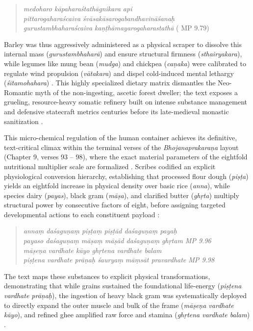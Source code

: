 \documentclass[11pt,twoside,letterpaper]{article}
\begin{document}
\begin{quote}
\textit{medoharo kāpaharaśtathāgnikara api \\
pittarogaharaścaiva śvāsakāsarogabandhavināśanaḥ  \\
gurustambhaharaścaiva kaṇṭhāmayarogaharastathā }( MP 9.79)
\end{quote}

Barley was thus aggressively administered as a physical scraper to dissolve this internal mass (\textit{gurustambhaharā}) and ensure structural firmness (\textit{sthairyakara}), while legumes like mung bean (\textit{mudga}) and chickpea (\textit{caṇaka}) were calibrated to regulate wind propulsion (\textit{vātakara}) and dispel cold-induced mental lethargy (\textit{śītamohahara}) \citep{MP_7}. This highly specialized dietary matrix dismantles the Neo-Romantic myth of the non-ingesting, ascetic forest dweller; the text exposes a grueling, resource-heavy somatic refinery built on intense substance management and defensive statecraft metrics centuries before its late-medieval monastic sanitization \citep{MP_7, Wujastyk2025}.

This micro-chemical regulation of the human container achieves its definitive, text-critical climax within the terminal verses of the \textit{Bhojanaprakaraṇa} layout (Chapter 9, verses 93 -- 98), where the exact material parameters of the eightfold nutritional multiplier scale are formalized \citep{MP_7}. Scribes codified an explicit physiological conversion hierarchy, establishing that processed flour dough (\textit{piṣṭa}) yields an eightfold increase in physical density over basic rice (\textit{anna}), while species dairy (\textit{payas}), black gram (\textit{māṣa}), and clarified butter (\textit{ghṛta}) multiply structural power by consecutive factors of eight, before assigning targeted developmental actions to each constituent payload \citep{MP_7}:

\begin{quote}
\small
\textit{annaṃ daśaguṇaṃ piṣṭaṃ piṣṭād daśaguṇaṃ payaḥ \vert \\
payaso daśaguṇaṃ māṣaṃ māṣād daśaguṇaṃ ghṛtam \vert\vert MP 9.96 \vert\vert \\
māṣeṇa vardhate kāyo ghṛtena vardhate balam \vert \\
piṣṭena vardhate prāṇaḥ śauryaṃ māṃsāt pravardhate \vert\vert MP 9.98 \vert\vert}
\end{quote}

The text maps these substances to explicit physical transformations, demonstrating that while grains sustained the foundational life-energy (\textit{piṣṭena vardhate prāṇaḥ}), the ingestion of heavy black gram was systematically deployed to directly expand the outer muscle and bulk of the frame (\textit{māṣeṇa vardhate kāyo}), and refined ghee amplified raw force and stamina (\textit{ghṛtena vardhate balam}) \citep{MP_7}. 
\end{document}
